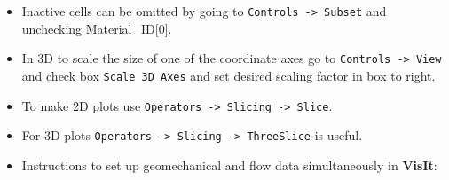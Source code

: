 \begin{itemize}
\item Inactive cells can be omitted by going to {\small\tt Controls -> Subset} and unchecking Material\_ID[0].

\item In 3D to scale the size of one of the coordinate axes go to 
{\tt Controls -> View}
and check box {\small\tt Scale 3D Axes} and set desired scaling factor in box to right.

\item To make 2D plots use {\small\tt Operators -> Slicing -> Slice}.

\item For 3D plots {\small\tt Operators -> Slicing -> ThreeSlice} is useful.

\item Instructions to set up geomechanical and flow data simultaneously in {\bf VisIt}:



\end{itemize}
